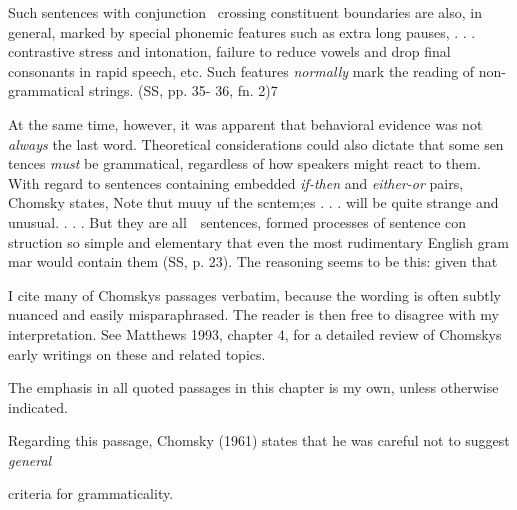 \begin{styleStandard}
Such sentences with conjunction \ crossing constituent boundaries are also, in general, marked by special phonemic features such as extra long pauses, . . . contrastive stress and intonation, failure to reduce vowels and drop final consonants in rapid speech, etc. Such features \textit{normally}\textit{ }mark the reading of non-grammatical strings. (SS, pp. 35- 36, fn. 2)7
\end{styleStandard}


\begin{styleStandard}
At the same time, however, it was apparent that behavioral evidence was not \textit{always}\textit{ }the last word. Theoretical considerations could also dictate that some sen\- tences \textit{must}\textit{ }be grammatical, regardless of how speakers might react to them. With regard to sentences containing embedded \textit{if-then}\textit{ }and \textit{either-or}\textit{ }pairs, Chomsky states, {\textquotedbl}Note thut muuy uf the scntem;es . . . will be quite strange and unusual. . . . But they are all\ \ sentences, formed processes of sentence con\- struction so simple and elementary that even the most rudimentary English gram\- mar would contain them{\textquotedbl} (SS, p. 23). The reasoning seems to be this: given that
\end{styleStandard}


\begin{listWWNumlxvleveli}
\item 
\begin{styleStandard}
I cite many of Chomsky{\textquotesingle}s passages verbatim, because the wording is often subtly nuanced and easily misparaphrased. The reader is then free to disagree with my interpretation. See Matthews 1993, chapter 4, for a detailed review of Chomsky{\textquotesingle}s early writings on these and related topics.
\end{styleStandard}


\item 
\begin{styleStandard}
The emphasis in all quoted passages in this chapter is my own, unless otherwise indicated.
\end{styleStandard}


\item 
\begin{styleStandard}
Regarding this passage, Chomsky (1961) states that he was careful not to suggest \textit{general}
\end{styleStandard}


\end{listWWNumlxvleveli}
\begin{styleStandard}
criteria for grammaticality.
\end{styleStandard}


